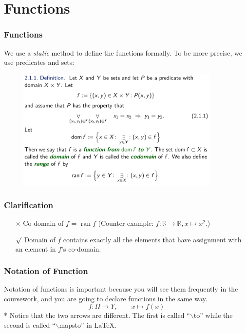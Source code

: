 \documentclass[10pt, t]{beamer}
\newcommand{\R}{\mathbb{R}}
\begin{document}
\section{Functions}
\begin{frame}
    \frametitle{Functions}
    We use a \textit{static} method to define the functions formally. To be more precise, we use predicates and sets:
    \begin{figure}[H]
        \centering
        \includegraphics[width=0.9\textwidth]{2020-09-30-12-16-15.png}
    \end{figure}
\end{frame}

\begin{frame}
    \frametitle{Clarification}

    \begin{itemize}
        \item[$\times$] Co-domain of $f$ = $\operatorname{ran} f$ (Counter-example: $f:\R\to\R,x\mapsto x^2.$)
        \item[$\surd $] Domain of $f$ contains exactly all the elements that
              have assignment with an element in $f$’s co-domain.
    \end{itemize}

\end{frame}

\begin{frame}
    \frametitle{Notation of Function}

    Notation of functions is important because you will see them frequently in the coursework, and you are going to declare functions in the same way.
    $$f:\Omega\to Y,\qquad x\mapsto f(x)$$
    * Notice that the two arrows are different. The first is called ``$\backslash$to''  while the second is called ``$\backslash$mapsto'' in \LaTeX.

\end{frame}
\end{document}
